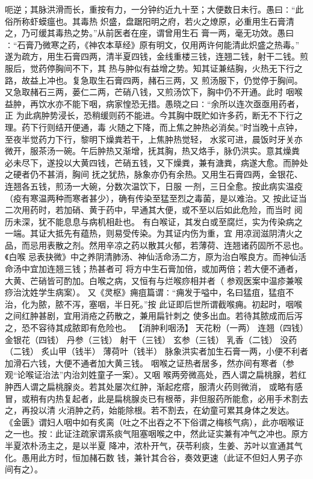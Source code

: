 \documentclass[a4paper,12pt,UTF8,twoside]{ctexbook}
\begin{document}
呃逆；其脉洪滑而长，重按有力，一分钟约近九十至；大便数日未行。愚曰∶“此俗所称虾蟆瘟也。其毒热 
炽盛，盘踞阳明之府，若火之燎原，必重用生石膏清之，乃可缓其毒热之势。”从前医者在座，谓曾用生石 
膏一两，毫无功效。愚曰∶“石膏乃微寒之药，《神农本草经》原有明文，仅用两许何能清此炽盛之热毒。” 
遂为疏方，用生石膏四两，清半夏四钱，金线重楼三钱，连翘二钱，射干二钱。煎服后，觉药停胸间不下，其 
热与肿似有益增之势。知其证兼结胸，火热无下行之路，故益上冲也。复急取生石膏四两，赭石三两，又 
煎汤服下，仍觉停于胸间。又急取赭石三两，蒌仁二两，芒硝八钱，又煎汤饮下，胸中仍不开通。此时 
咽喉益肿，再饮水亦不能下咽，病家惶恐无措。愚晓之曰∶“余所以连次亟亟用药者，正 
为此病肿势浸长，恐稍缓则药不能进。今其胸中既贮如许多药，断无不下行之理。药下行则结开便通，毒 
火随之下降，而上焦之肿热必消矣。”时当晚十点钟，至夜半觉药力下行，黎明下燥粪若干，上焦肿热觉轻， 
水浆可进，晨饭时牙关亦微开，服茶汤一碗。午后肿热又渐增，抚其胸，热又烙手，脉仍洪实。意其燥粪 
必未尽下，遂投以大黄四钱，芒硝五钱，又下燥粪，兼有溏粪，病遂大愈。而肿处之硬者仍不甚消，胸间 
抚之犹热，脉象亦仍有余热。又用生石膏四两，金银花、连翘各五钱，煎汤一大碗，分数次温饮下，日服 
一剂，三日全愈。按此病实温疫（疫有寒温两种而寒者甚少），确有传染至猛至烈之毒菌，是以难治。又 
按此证当二次用药时，若加硝、黄于药中，早通其大便，或不至以后如此危险，而当时 
阅历未深，犹不能息息与病机相赴也。 
有白喉证，其发白或至腐烂，实为传染病之一端。其证大抵先有蕴热，则易受传染。为其证内伤为重，宜 
用凉润滋阴清火之品，而忌用表散之剂。然用辛凉之药以散其火郁，若薄荷、连翘诸药固所不忌也。《白喉 
忌表抉微》中之养阴清肺汤、神仙活命汤二方，原为治白喉良方。而神仙活命汤中宜加连翘三钱；热甚者可 
将方中生石膏加倍，或加两倍；若大便不通者，大黄、芒硝皆可酌加。白喉之病，又恒有与烂喉痧相并者（ 
参观医案中温疹兼喉痧治沈姓学生病案）。 
又《灵枢》痈疽篇谓∶“痈发于嗌中，名曰猛疽，猛疽不治，化为脓，脓不泻，塞咽，半日死。”按 
此证即后世所谓截喉痈。初起时，咽喉之间红肿甚剧，宜用消疮之药散之，兼用扁针刺之 
使多出血。若待其脓成而后泻之，恐不容待其成脓即有危险也。 
【消肿利咽汤】 
天花粉（一两） 连翘（四钱） 金银花（四钱） 丹参（三钱） 
射干（三钱） 玄参（三钱） 乳香（二钱） 没药（二钱） 
炙山甲（钱半） 薄荷叶（钱半） 
脉象洪实者加生石膏一两，小便不利者加滑石六钱，大便不通者加大黄三钱。 
咽喉之证热者居多，然亦间有寒者（参观“论喉证治法”内治刘姓童子一案）。又咽 
喉两旁微高处，西人谓之扁桃腺，若红肿西人谓之扁桃腺炎。若其处屡次红肿，渐起疙瘩，服清火药则微消， 
或略有感冒，或稍有内热复起者，此是扁桃腺炎已有根蒂，非但服药所能愈，必用手术割去之，再投以清 
火消肿之药，始能除根。若不割去，在幼童可累其身体之发达。 
《金匮》谓妇人咽中如有炙脔（吐之不出吞之不下俗谓之梅核气病），此亦咽喉证 
之一也。按∶此证注疏家谓系痰气阻塞咽喉之中，然此证实兼有冲气之冲也。原方半夏浓朴汤主之，是以半夏 
降冲，浓朴开气，茯苓利痰，生姜、苏叶以宣通其气化。愚用此方时，恒加赭石数 
钱，兼针其合谷，奏效更速（此证不但妇人男子亦间有之）。 
\end{document}
